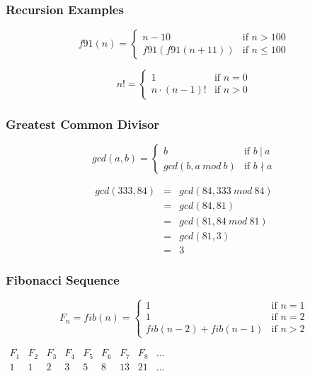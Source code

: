\documentclass[dvipsnames]{beamer}
\begin{document}
\begin{frame}
  \frametitle{Recursion Examples}

  \[
    f91(n) =
      \begin{cases}
        n - 10         & \mbox{if } n > 100\\
        f91(f91(n+11)) & \mbox{if } n \leq 100
      \end{cases}
  \]

  \pause
  \bigskip
  \[
    n! =
      \begin{cases}
        1              & \mbox{if } n = 0\\
        n \cdot (n-1)! & \mbox{if } n > 0
      \end{cases}
  \]
\end{frame}

\begin{frame}
  \frametitle{Greatest Common Divisor}

  \[
    gcd(a,b) =
      \begin{cases}
        b              & \mbox{if } b~|~a\\
        gcd(b,a~mod~b) & \mbox{if } b \nmid a
      \end{cases}
  \]

  \pause
  \medskip
  \begin{eqnarray*}
    gcd(333,84) & = & gcd(84, 333~mod~84)\\
                & = & gcd(84, 81)\\
                & = & gcd(81, 84~mod~81)\\
                & = & gcd(81, 3)\\
                & = & 3
  \end{eqnarray*}
\end{frame}

\begin{frame}
  \frametitle{Fibonacci Sequence}

  \[
    F_n = fib(n) =
      \begin{cases}
        1                   & \mbox{if } n = 1\\
        1                   & \mbox{if } n = 2\\
        fib(n-2) + fib(n-1) & \mbox{if } n > 2
      \end{cases}
  \]

  \bigskip
  $\begin{array}{ccccccccc}
     F_1 & F_2 & F_3 & F_4 & F_5 & F_6 & F_7 & F_8 & \dots\\
     1   & 1   & 2   & 3   & 5   & 8   & 13  & 21  & \dots
  \end{array}$
\end{frame}
\end{document}
